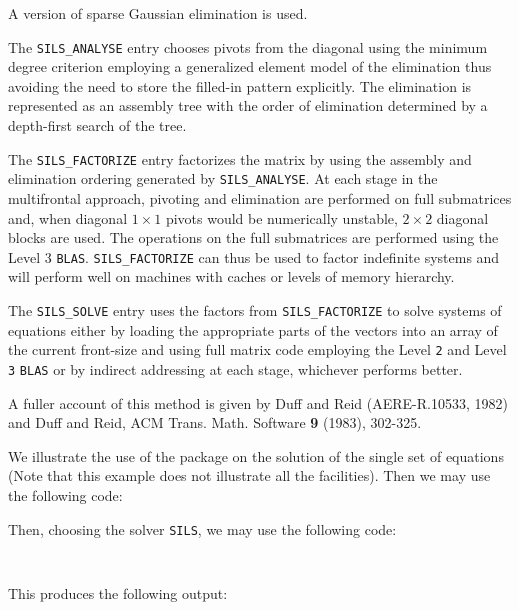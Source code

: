 \documentclass{galahad}
\newcommand{\packagename}{SILS}
\begin{document}

\galmethod
A version of sparse Gaussian elimination is used.


The {\tt \packagename\_ANALYSE} entry chooses pivots from the
 diagonal using the minimum degree criterion employing a
 generalized element model of the elimination thus avoiding the
 need to store the filled-in pattern explicitly.  The
 elimination is represented as an assembly tree
 with the order of elimination determined by a depth-first
 search of the tree.


The {\tt \packagename\_FACTORIZE} entry factorizes the matrix by using the
 assembly and elimination ordering generated by {\tt \packagename\_ANALYSE}.  At
 each stage in the multifrontal approach, pivoting and
 elimination are performed on full submatrices and, when
 diagonal $1 \times 1$ pivots would be numerically unstable, $2 \times 2$
 diagonal blocks are used.  The operations on the full submatrices
 are performed using the Level 3 {\tt BLAS}.  {\tt \packagename\_FACTORIZE}
 can thus be  used to
 factor indefinite systems and will perform well on machines
 with caches or levels of memory hierarchy.


The {\tt \packagename\_SOLVE} entry uses the factors from
{\tt \packagename\_FACTORIZE} to solve
 systems of equations either by loading the appropriate parts of
 the vectors into an  array  of the current front-size and
 using full matrix code employing the Level {\tt 2} and Level {\tt 3}
{\tt BLAS}
 or by indirect addressing at each stage,
 whichever performs better.


\galreference
A fuller account of this method is given by Duff and Reid
(AERE-R.10533, 1982) and Duff and Reid, ACM Trans. Math.
Software {\bf 9} (1983), 302-325.



\galexample
We illustrate the use of the package on the solution of the
single set of equations
(Note that this example does not illustrate all the facilities).
Then we may use the following code:

Then, choosing the solver {\tt SILS}, we may use the following code:

{\tt \small
\VerbatimInput{\packageexample}
}
\noindent

This produces the following output:
{\tt \small
\VerbatimInput{\packageresults}
}
\end{document}
